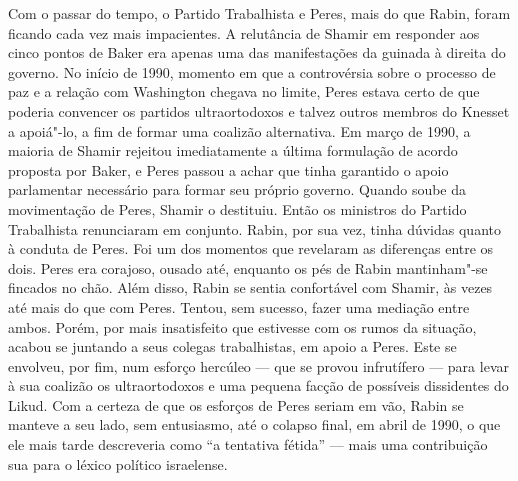 Com o passar do tempo, o Partido Trabalhista e Peres, mais do que Rabin,
foram ficando cada vez mais impacientes. A relutância de Shamir em
responder aos cinco pontos de Baker era apenas uma das manifestações da
guinada à direita do governo. No início de 1990, momento em que a
controvérsia sobre o processo de paz e a relação com Washington chegava
no limite, Peres estava certo de que poderia convencer os partidos
ultraortodoxos e talvez outros membros do Knesset a apoiá"-lo, a fim de
formar uma coalizão alternativa. Em março de 1990, a maioria de Shamir
rejeitou imediatamente a última formulação de acordo proposta por Baker,
e Peres passou a achar que tinha garantido o apoio parlamentar
necessário para formar seu próprio governo. Quando soube da movimentação
de Peres, Shamir o destituiu. Então os ministros do Partido Trabalhista
renunciaram em conjunto. Rabin, por sua vez, tinha dúvidas quanto à
conduta de Peres. Foi um dos momentos que revelaram as diferenças entre
os dois. Peres era corajoso, ousado até, enquanto os pés de Rabin
mantinham"-se fincados no chão. Além disso, Rabin se sentia confortável
com Shamir, às vezes até mais do que com Peres. Tentou, sem sucesso,
fazer uma mediação entre ambos. Porém, por mais insatisfeito
que estivesse com os rumos da situação, acabou se juntando a seus
colegas trabalhistas, em apoio a Peres. Este se envolveu, por fim, num
esforço hercúleo --- que se provou infrutífero --- para levar à sua
coalizão os ultraortodoxos e uma pequena facção de possíveis dissidentes
do Likud. Com a certeza de que os esforços de Peres seriam em vão, Rabin
se manteve a seu lado, sem entusiasmo, até o colapso final, em abril de
1990, o que ele mais tarde descreveria como ``a tentativa fétida'' ---
mais uma contribuição sua para o léxico político israelense.

